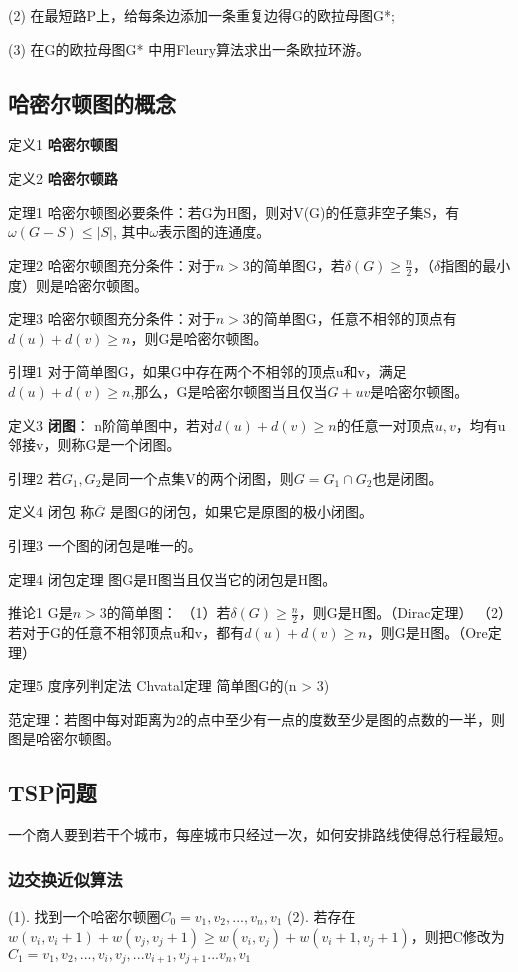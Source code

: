 \documentclass{article}
\begin{document}
(2) 在最短路P上，给每条边添加一条重复边得G的欧拉母图G*;

(3) 在G的欧拉母图G* 中用Fleury算法求出一条欧拉环游。

\subsection{哈密尔顿图的概念}

定义1 \textbf{哈密尔顿图}

定义2 \textbf{哈密尔顿路}

定理1 哈密尔顿图必要条件：若G为H图，则对V(G)的任意非空子集S，有$\omega (G-S) \le |S|$, 其中$\omega$表示图的连通度。

定理2 哈密尔顿图充分条件：对于$n>3$的简单图G，若$\delta(G) \ge \frac{n}{2}$，（$\delta$指图的最小度）则是哈密尔顿图。

定理3 哈密尔顿图充分条件：对于$n>3$的简单图G，任意不相邻的顶点有$d(u)+d(v) \ge n$，则G是哈密尔顿图。

引理1 对于简单图G，如果G中存在两个不相邻的顶点u和v，满足$d(u) + d(v) \ge n$,那么，G是哈密尔顿图当且仅当$G+uv$是哈密尔顿图。

定义3 \textbf{闭图}： n阶简单图中，若对$d(u) + d(v) \ge n$的任意一对顶点$u,v$，均有u邻接v，则称G是一个闭图。

引理2 若$G_1,G_2$是同一个点集V的两个闭图，则$G = G_1 \cap G_2$也是闭图。

定义4 闭包 称$\overline G$ 是图G的闭包，如果它是原图的极小闭图。

引理3 一个图的闭包是唯一的。

定理4 闭包定理 图G是H图当且仅当它的闭包是H图。

推论1 G是$n > 3$的简单图：
（1）若$\delta(G) \ge \frac{n}{2}$，则G是H图。（Dirac定理）
（2）若对于G的任意不相邻顶点u和v，都有$d(u) + d(v) \ge n$，则G是H图。（Ore定理）

定理5 度序列判定法 Chvatal定理 简单图G的(n > 3)

范定理：若图中每对距离为2的点中至少有一点的度数至少是图的点数的一半，则图是哈密尔顿图。

\subsection{TSP问题}
一个商人要到若干个城市，每座城市只经过一次，如何安排路线使得总行程最短。

\subsubsection{边交换近似算法}
(1). 找到一个哈密尔顿圈$C_0 = v_1,v_2,...,v_n,v_1$
(2). 若存在$w(v_i,v_i+1) + w(v_j,v_j+1) \ge w(v_i,v_j) + w(v_i+1,v_j+1)$，则把C修改为$C_1 = v_1,v_2,...,v_i,v_j,...v_{i+1},v_{j+1}...v_n,v_1$
\end{document}
